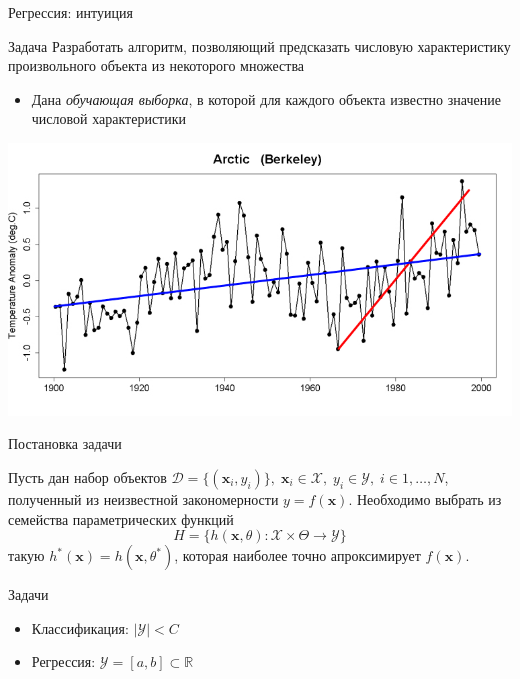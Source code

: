 \documentclass[10pt]{beamer}
\begin{document}
\begin{frame}{Регрессия: интуиция}

\begin{block}{Задача}
Разработать алгоритм, позволяющий предсказать числовую характеристику произвольного объекта из некоторого множества
\begin{itemize}
\item Дана {\it обучающая выборка}, в которой для каждого объекта известно значение числовой характеристики
\end{itemize}
\end{block}

\begin{center}
\includegraphics[scale=0.3]{images/kioto.png}
\end{center}

\end{frame}

\begin{frame}{Постановка задачи}

Пусть дан набор объектов $\mathcal{D} = \{(\mathbf{x}_i, y_i)\},
\; \mathbf{x}_i \in \mathcal{X},
\; y_i \in \mathcal{Y},
\; i \in 1, \ldots, N$, полученный из неизвестной закономерности $y = f(\mathbf{x})$. Необходимо выбрать из семейства параметрических функций
\[
H = \{h(\mathbf{x}, \theta): \mathcal{X} \times \Theta \rightarrow \mathcal{Y} \}
\]
такую $h^*(\mathbf{x}) = h(\mathbf{x}, \theta^*)$, которая наиболее точно апроксимирует $f(\mathbf{x})$.

\vspace{1em}
Задачи
\begin{itemize}
\item Классификация: $|\mathcal{Y}| < C$
\item Регрессия: $\mathcal{Y} = [a, b] \subset \mathbb{R}$
\end{itemize}

\end{frame}
\end{document}
